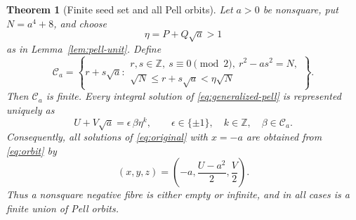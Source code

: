 \documentclass[11pt]{article}
\newtheorem{theorem}{Theorem}[section]
\theoremstyle{remark}
\newcommand{\Z}{\mathbb Z}
\begin{document}
\begin{theorem}[Finite seed set and all Pell orbits]\label{thm:pell-orbits}
Let $a>0$ be nonsquare, put $N=a^4+8$, and choose
\[
 \eta=P+Q\sqrt a>1
\]
as in Lemma~\ref{lem:pell-unit}.  Define
\begin{equation}\label{eq:seed-set}
 \mathcal C_a=
 \left\{
  r+s\sqrt a:
  \begin{array}{l}
   r,s\in\Z,\ s\equiv0\pmod2,\ r^2-as^2=N,\\
   \sqrt N\le r+s\sqrt a<\eta\sqrt N
  \end{array}
 \right\}.
\end{equation}
Then $\mathcal C_a$ is finite.  Every integral solution of \eqref{eq:generalized-pell} is represented uniquely as
\begin{equation}\label{eq:orbit}
 U+V\sqrt a=\epsilon\,\beta\eta^k,
 \qquad
 \epsilon\in\{\pm1\},\quad k\in\Z,\quad \beta\in\mathcal C_a.
\end{equation}
Consequently, all solutions of \eqref{eq:original} with $x=-a$ are obtained from \eqref{eq:orbit} by
\begin{equation}\label{eq:pell-back}
 (x,y,z)=\left(-a,\frac{U-a^2}{2},\frac V2\right).
\end{equation}
Thus a nonsquare negative fibre is either empty or infinite, and in all cases is a finite union of Pell orbits.
\end{theorem}
\end{document}
